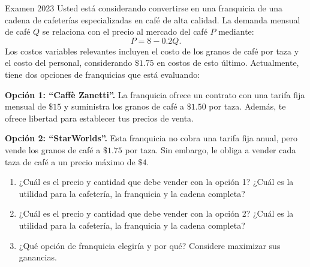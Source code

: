 \documentclass[11pt,a4paper]{article}
\begin{document}
\begin{enunciado}{Examen 2023}
Usted está considerando convertirse en una franquicia de una cadena de cafeterías especializadas en café de alta calidad. La demanda mensual de café \(Q\) se relaciona con el precio al mercado del café \(P\) mediante:
\[
P=8-0.2Q.
\]
Los costos variables relevantes incluyen el costo de los granos de café por taza y el costo del personal, considerando \(\$1.75\) en costos de esto último. Actualmente, tiene dos opciones de franquicias que está evaluando:

\textbf{Opción 1: ``Caffè Zanetti''.} La franquicia ofrece un contrato con una tarifa fija mensual de \(\$15\) y suministra los granos de café a \(\$1.50\) por taza. Además, te ofrece libertad para establecer tus precios de venta.

\textbf{Opción 2: ``StarWorlds''.} Esta franquicia no cobra una tarifa fija anual, pero vende los granos de café a \(\$1.75\) por taza. Sin embargo, le obliga a vender cada taza de café a un precio máximo de \(\$4\).

\begin{enumerate}[label=\alph*)]
    \item ¿Cuál es el precio y cantidad que debe vender con la opción 1? ¿Cuál es la utilidad para la cafetería, la franquicia y la cadena completa?
    \item ¿Cuál es el precio y cantidad que debe vender con la opción 2? ¿Cuál es la utilidad para la cafetería, la franquicia y la cadena completa?
    \item ¿Qué opción de franquicia elegiría y por qué? Considere maximizar sus ganancias.
\end{enumerate}
\end{enunciado}
\end{document}
